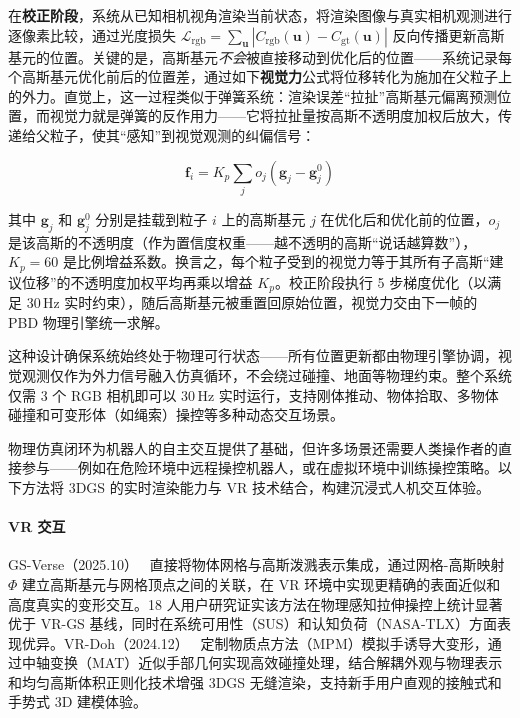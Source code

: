 在\textbf{校正阶段}，系统从已知相机视角渲染当前状态，将渲染图像与真实相机观测进行逐像素比较，通过光度损失 $\mathcal{L}_{\text{rgb}} = \sum_{\boldsymbol{u}} |C_{\text{rgb}}(\mathbf{u}) - C_{\text{gt}}(\mathbf{u})|$ 反向传播更新高斯基元的位置。关键的是，高斯基元\emph{不会}被直接移动到优化后的位置——系统记录每个高斯基元优化前后的位置差，通过如下\textbf{视觉力}公式将位移转化为施加在父粒子上的外力。直觉上，这一过程类似于弹簧系统：渲染误差``拉扯''高斯基元偏离预测位置，而视觉力就是弹簧的反作用力——它将拉扯量按高斯不透明度加权后放大，传递给父粒子，使其``感知''到视觉观测的纠偏信号：

\begin{equation}
    \boldsymbol{f}_i = K_p \sum_{j} o_j \left( \boldsymbol{g}_j - \boldsymbol{g}_j^0 \right)
\end{equation}

其中 $\boldsymbol{g}_j$ 和 $\boldsymbol{g}_j^0$ 分别是挂载到粒子 $i$ 上的高斯基元 $j$ 在优化后和优化前的位置，$o_j$ 是该高斯的不透明度（作为置信度权重——越不透明的高斯``说话越算数''），$K_p = 60$ 是比例增益系数。换言之，每个粒子受到的视觉力等于其所有子高斯``建议位移''的不透明度加权平均再乘以增益 $K_p$。校正阶段执行 5 步梯度优化（以满足 30\,Hz 实时约束），随后高斯基元被重置回原始位置，视觉力交由下一帧的 PBD 物理引擎统一求解。

这种设计确保系统始终处于物理可行状态——所有位置更新都由物理引擎协调，视觉观测仅作为外力信号融入仿真循环，不会绕过碰撞、地面等物理约束。整个系统仅需 3 个 RGB 相机即可以 30\,Hz 实时运行，支持刚体推动、物体拾取、多物体碰撞和可变形体（如绳索）操控等多种动态交互场景。

物理仿真闭环为机器人的自主交互提供了基础，但许多场景还需要人类操作者的直接参与——例如在危险环境中远程操控机器人，或在虚拟环境中训练操控策略。以下方法将 3DGS 的实时渲染能力与 VR 技术结合，构建沉浸式人机交互体验。

\paragraph{VR 交互}

GS-Verse（2025.10）~\cite{2510_11878} 直接将物体网格与高斯泼溅表示集成，通过网格-高斯映射 $\Phi$ 建立高斯基元与网格顶点之间的关联，在 VR 环境中实现更精确的表面近似和高度真实的变形交互。18 人用户研究证实该方法在物理感知拉伸操控上统计显著优于 VR-GS 基线，同时在系统可用性（SUS）和认知负荷（NASA-TLX）方面表现优异。VR-Doh（2024.12）~\cite{2412_00814} 定制物质点方法（MPM）模拟手诱导大变形，通过中轴变换（MAT）近似手部几何实现高效碰撞处理，结合解耦外观与物理表示和均匀高斯体积正则化技术增强 3DGS 无缝渲染，支持新手用户直观的接触式和手势式 3D 建模体验。

